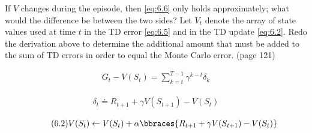 
\begin{exercise}[Exercise 6.1]

If $V$ changes during the episode, then \eqref{eq:6.6} only holds approximately;
what would the difference be between the two sides?
Let $V_t$ denote the array of state values used at time $t$ in the TD error \eqref{eq:6.5} and in the TD update \eqref{eq:6.2}.
Redo the derivation above to determine the additional amount that must be added to the sum of TD errors in order to equal the Monte Carlo error.
(page 121)

\end{exercise}


\begin{solution}

\begin{align} \tag{6.6} \label{eq:6.6}
    G_t - V(S_t)
    =
    \sum_{k=t}^{T-1}
        \gamma^{k-t}
        \delta_k
\end{align}

\begin{align} \tag{6.5} \label{eq:6.5}
    \delta_t
    \doteq
    R_{t+1} + \gamma V(S_{t+1}) - V(S_t)
\end{align}

\begin{align} \tag{6.2} \label{eq:6.2}
    V(S_t)
    \leftarrow
    V(S_t) + \alpha \bbraces{R_{t+1} + \gamma V(S_{t+1}) - V(S_t)}
\end{align}

\end{solution}

